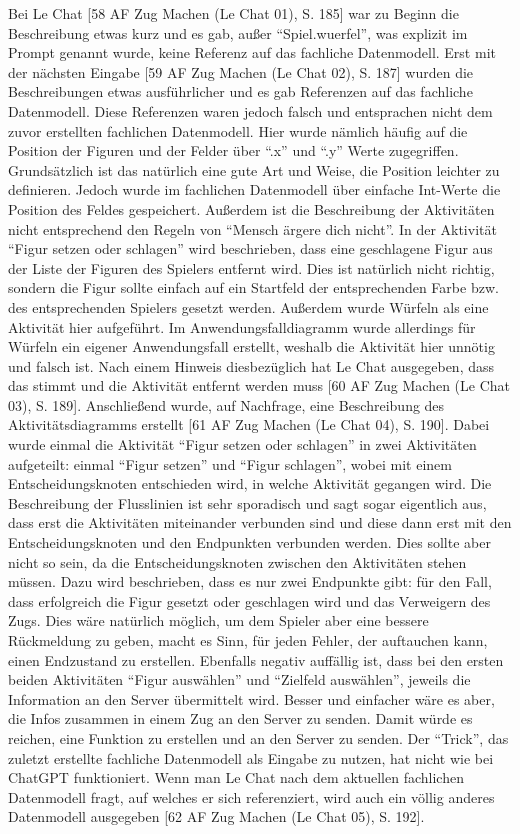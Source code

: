 Bei Le Chat [58 AF Zug Machen (Le Chat 01), S. 185] war zu Beginn die Beschreibung etwas kurz und es gab, außer ``Spiel.wuerfel'', was explizit im Prompt genannt wurde, keine 
Referenz auf das fachliche Datenmodell. Erst mit der nächsten Eingabe [59 AF Zug Machen (Le Chat 02), S. 187] wurden die Beschreibungen etwas ausführlicher 
und es gab Referenzen auf das fachliche Datenmodell. Diese Referenzen waren jedoch falsch und entsprachen nicht dem zuvor erstellten 
fachlichen Datenmodell. Hier wurde nämlich häufig auf die Position der Figuren und der Felder über ``.x'' und ``.y'' Werte zugegriffen. 
Grundsätzlich ist das natürlich eine gute Art und Weise, die Position leichter zu definieren. Jedoch wurde im fachlichen Datenmodell über 
einfache Int-Werte die Position des Feldes gespeichert. Außerdem ist die Beschreibung der Aktivitäten nicht entsprechend den Regeln von 
``Mensch ärgere dich nicht''. In der Aktivität ``Figur setzen oder schlagen'' wird beschrieben, dass eine geschlagene Figur aus der Liste der 
Figuren des Spielers entfernt wird. Dies ist natürlich nicht richtig, sondern die Figur sollte einfach auf ein Startfeld der entsprechenden 
Farbe bzw. des entsprechenden Spielers gesetzt werden. Außerdem wurde Würfeln als eine Aktivität hier aufgeführt. Im Anwendungsfalldiagramm 
wurde allerdings für Würfeln ein eigener Anwendungsfall erstellt, weshalb die Aktivität hier unnötig und falsch ist. Nach einem Hinweis 
diesbezüglich hat Le Chat ausgegeben, dass das stimmt und die Aktivität entfernt werden muss [60 AF Zug Machen (Le Chat 03), S. 189]. Anschließend wurde, auf Nachfrage, eine 
Beschreibung des Aktivitätsdiagramms erstellt [61 AF Zug Machen (Le Chat 04), S. 190]. Dabei wurde einmal die Aktivität ``Figur setzen oder schlagen'' in zwei Aktivitäten aufgeteilt: 
einmal ``Figur setzen'' und ``Figur schlagen'', wobei mit einem Entscheidungsknoten entschieden wird, in welche Aktivität gegangen wird. Die 
Beschreibung der Flusslinien ist sehr sporadisch und sagt sogar eigentlich aus, dass erst die Aktivitäten miteinander verbunden sind und 
diese dann erst mit den Entscheidungsknoten und den Endpunkten verbunden werden. Dies sollte aber nicht so sein, da die Entscheidungsknoten 
zwischen den Aktivitäten stehen müssen. Dazu wird beschrieben, dass es nur zwei Endpunkte gibt: für den Fall, dass erfolgreich die Figur 
gesetzt oder geschlagen wird und das Verweigern des Zugs. Dies wäre natürlich möglich, um dem Spieler aber eine bessere Rückmeldung zu geben, 
macht es Sinn, für jeden Fehler, der auftauchen kann, einen Endzustand zu erstellen. Ebenfalls negativ auffällig ist, dass bei den ersten 
beiden Aktivitäten ``Figur auswählen'' und ``Zielfeld auswählen'', jeweils die Information an den Server übermittelt wird. Besser und einfacher 
wäre es aber, die Infos zusammen in einem Zug an den Server zu senden. Damit würde es reichen, eine Funktion zu erstellen und an den Server 
zu senden. Der ``Trick'', das zuletzt erstellte fachliche Datenmodell als Eingabe zu nutzen, hat nicht wie bei ChatGPT funktioniert. Wenn man 
Le Chat nach dem aktuellen fachlichen Datenmodell fragt, auf welches er sich referenziert, wird auch ein völlig anderes Datenmodell ausgegeben 
[62 AF Zug Machen (Le Chat 05), S. 192].

